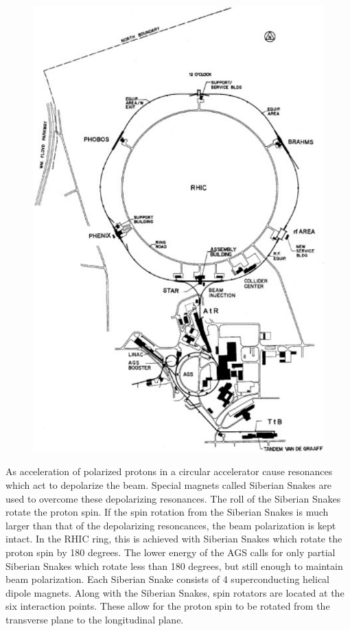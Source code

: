 \documentclass[abstract = on,listof=totoc, bibliography=totoc]{scrreprt}
\begin{document}
 \begin{figure}
\begin{center}
\includegraphics[width = 1\textwidth]{rhicBNL}
\caption[The RHIC complex]{}
\label{fig:rhic}
\end{center}
\end{figure}

As acceleration of polarized protons in a circular accelerator cause resonances which act to depolarize the beam. Special magnets called Siberian Snakes are used to overcome these depolarizing resonances. The roll of the Siberian Snakes rotate the proton spin. If the spin rotation from the Siberian Snakes is much larger than that of the depolarizing resoncances, the beam polarization is kept intact. In the RHIC ring, this is achieved with Siberian Snakes which rotate the proton spin by 180 degrees. The lower energy of the AGS calls for only partial Siberian Snakes which rotate less than 180 degrees, but still enough to maintain beam polarization. \cite{ppCollider}
Each Siberian Snake consists of 4 superconducting helical dipole magnets. Along with the Siberian Snakes, spin rotators are located at the six interaction points. These allow for the proton spin to be rotated from the transverse plane to the longitudinal plane.  \cite{ppCollider}
\end{document}

